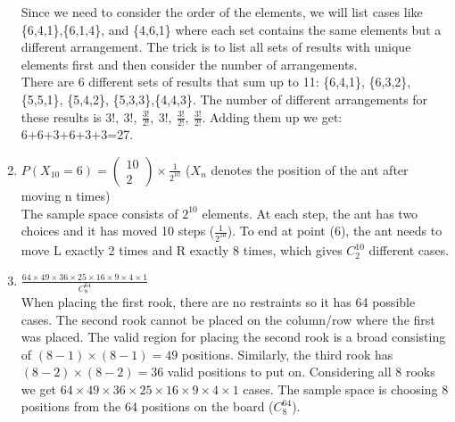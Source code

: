 \documentclass[11pt]{article}
\begin{document}
\begin{enumerate}
  Since we need to consider the order of the elements, we will list cases like \{6,4,1\},\{6,1,4\}, and \{4,6,1\} where each set contains the same elements but a different arrangement.
  The trick is to list all sets of results with unique elements first and then consider the number of arrangements.
  \\ There are 6 different sets of results that sum up to 11: \{6,4,1\}, \{6,3,2\}, \{5,5,1\}, \{5,4,2\}, \{5,3,3\},\{4,4,3\}.
  The number of different arrangements for these results is $3!, \: 3!, \: \frac{3!}{2!}, \: 3!, \: \frac{3!}{2!}, \: \frac{3!}{2!} $. Adding them up we get: 6+6+3+6+3+3=27.
  \item $P(X_{10}=6) = \left(\begin{array}{c} 10 \\ 2 \end{array}\right) \times \frac{1}{2^{10}}$ ($X_n$ denotes the position of the ant after moving n times)
  \\ The sample space consists of $2^{10}$ elements.
  At each step, the ant has two choices and it has moved 10 steps ($\frac{1}{2^{10}}$). To end at point (6), the ant needs to move L exactly 2 times and R exactly 8 times, which gives $C_2^{10}$ different cases.
  \item $\frac{64 \times 49 \times 36 \times 25 \times 16 \times 9 \times 4 \times 1}{C_8^{64}}$ 
  \\ When placing the first rook, there are no restraints so it has 64 possible cases. The second rook cannot be placed on the column/row where the first was placed. 
  The valid region for placing the second rook is a broad consisting of $(8-1) \times (8-1) = 49$ positions.
  Similarly, the third rook has $(8-2) \times (8-2) = 36$ valid positions to put on. Considering all 8 rooks we get $64 \times 49 \times 36 \times 25 \times 16 \times 9 \times 4 \times 1$ cases. The sample space is choosing 8 positions from the 64 positions on the board ($C_8^{64}$).
\end{enumerate}
\end{document}
